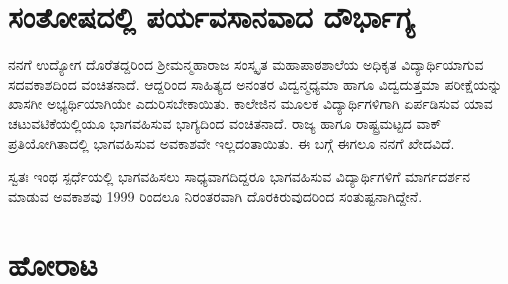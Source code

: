 {\section*{ಸಂತೋಷದಲ್ಲಿ ಪರ್ಯವಸಾನವಾದ ದೌರ್ಭಾಗ್ಯ}

ನನಗೆ ಉದ್ಯೋಗ ದೊರೆತದ್ದರಿಂದ ಶ್ರೀಮನ್ಮಹಾರಾಜ ಸಂಸ್ಕೃತ ಮಹಾಪಾಠಶಾಲೆಯ ಅಧಿಕೃತ ವಿದ್ಯಾರ್ಥಿಯಾಗುವ ಸದವಕಾಶದಿಂದ ವಂಚಿತನಾದೆ. ಆದ್ದರಿಂದ ಸಾಹಿತ್ಯದ ಅನಂತರ ವಿದ್ವನ್ಮಧ್ಯಮಾ ಹಾಗೂ ವಿದ್ವದುತ್ತಮಾ ಪರೀಕ್ಷೆಯನ್ನು ಖಾಸಗೀ ಅಭ್ಯರ್ಥಿಯಾಗಿಯೇ ಎದುರಿಸಬೇಕಾಯಿತು.  ಕಾಲೇಜಿನ ಮೂಲಕ ವಿದ್ಯಾರ್ಥಿಗಳಿಗಾಗಿ ಏರ್ಪಡಿಸುವ ಯಾವ ಚಟುವಟಿಕೆಯಲ್ಲಿಯೂ ಭಾಗವಹಿಸುವ ಭಾಗ್ಯದಿಂದ ವಂಚಿತನಾದೆ.  ರಾಜ್ಯ ಹಾಗೂ ರಾಷ್ಟ್ರಮಟ್ಟದ ವಾಕ್ ಪ್ರತಿಯೋಗಿತಾದಲ್ಲಿ ಭಾಗವಹಿಸುವ ಅವಕಾಶವೇ ಇಲ್ಲದಂತಾಯಿತು.  ಈ ಬಗ್ಗೆ ಈಗಲೂ ನನಗೆ ಖೇದವಿದೆ.  

ಸ್ವತಃ ಇಂಥ ಸ್ಪರ್ಧೆಯಲ್ಲಿ ಭಾಗವಹಿಸಲು ಸಾಧ್ಯವಾಗದಿದ್ದರೂ ಭಾಗವಹಿಸುವ ವಿದ್ಯಾರ್ಥಿಗಳಿಗೆ ಮಾರ್ಗದರ್ಶನ ಮಾಡುವ ಅವಕಾಶವು 1999 ರಿಂದಲೂ ನಿರಂತರವಾಗಿ ದೊರಕಿರುವುದರಿಂದ ಸಂತುಷ್ಟನಾಗಿದ್ದೇನೆ. 

\section*{ಹೋರಾಟ}

}
